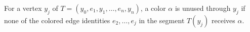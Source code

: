 \begin{definition}
For a vertex $y_j$ of
$T=(y_0,e_1,y_1,\ldots,e_n,y_n)$, a color $\alpha$ is unused through
$y_j$ if none of the colored edge identities $e_2,\ldots,e_j$ in the
segment $T(y_j)$ receives $\alpha$.
\end{definition}
